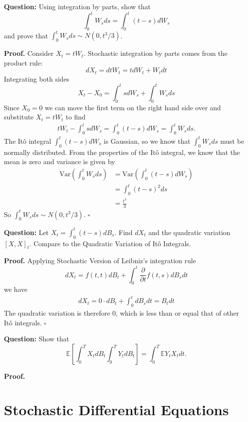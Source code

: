 \documentclass{article}
\begin{document}
\begin{tcolorbox}[colframe=black,colback=gray!5,boxrule=0.5pt]
\textbf{Question:} Using integration by parts, show that 
$$\int_0^tW_sds = \int_0^t(t-s)dW_s$$
and prove that $\int_0^t W_sds\sim N(0, t^3/3)$. 
\end{tcolorbox}
\textbf{Proof.} Consider $X_t = tW_t$. Stochastic integration by parts comes from the product rule: 
$$dX_t = dtW_t = tdW_t +W_tdt$$
Integrating both sides 
$$X_t - X_0 = \int_0^t sdW_s + \int_0^t W_sds$$
Since $X_0 = 0$ we can move the first term on the right hand side over and substitute $X_t = tW_t$ to find 
\begin{align*}
    tW_t - \int_0^tsdW_s = \int_0^t(t-s)dW_s = \int_0^tW_sds.
\end{align*}
The Itô integral $\int_0^t(t-s)dW_s$ is Gaussian, so we know that $\int_0^tW_sds$ must be normally distributed. From the properties of the Itô integral, we know that the mean is zero and variance is given by 
\begin{align*}
    \text{Var}\left(\int_0^tW_sds\right) &= \text{Var}\left(\int_0^t(t-s)dW_s\right) \\
    &= \int_0^t(t-s)^2ds \\
    &= \frac{t^3}{3}
\end{align*}
So $\int_0^tW_sds\sim N(0,t^3/3)$. $\square$

\begin{tcolorbox}[colframe=black,colback=gray!5,boxrule=0.5pt]
\textbf{Question:} Let $X_t = \int_0^t(t-s)dB_s$. Find $dX_t$ and the quadratic variation $[X,X]_t$. Compare to the Quadratic Variation of Itô Integrals.
\end{tcolorbox}
\textbf{Proof.} Applying Stochastic Version of Leibniz's integration rule 
$$dX_t = f(t,t)dB_t + \int_0^t\frac{\partial}{\partial t}f(t,s)dB_sdt$$
we have 
\begin{align*}
    dX_t = 0\cdot dB_t + \int_0^t dB_sdt = B_tdt
\end{align*}
The quadratic variation is therefore 0, which is less than or equal that of other Itô integrals. $\square$

\begin{tcolorbox}[colframe=black,colback=gray!5,boxrule=0.5pt]
\textbf{Question:} Show that 
$$\mathbb{E}\left[\int_0^TX_tdB_t\int_0^TY_tdB_t\right] = \int_0^T\mathbb{E}Y_tX_tdt.$$
\end{tcolorbox}
\textbf{Proof.}


\newpage
\section{Stochastic Differential Equations}
\end{document}
